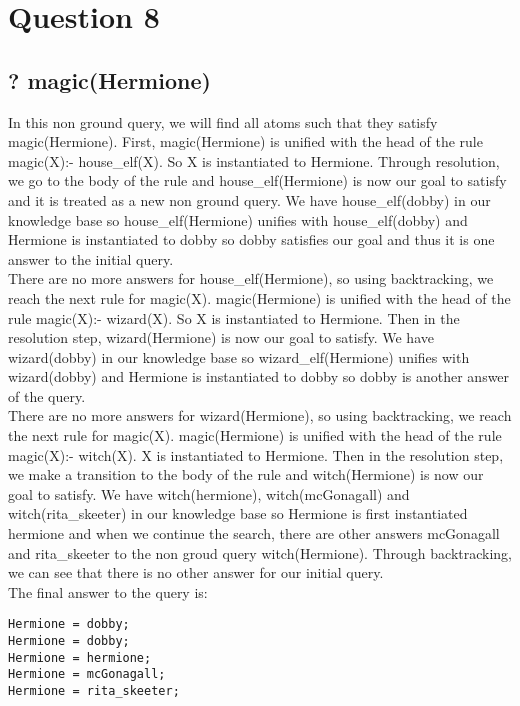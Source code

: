 \newpage
\section{Question 8}

\subsection{? magic(Hermione)}
In this non ground query, we will find all atoms such that they satisfy magic(Hermione). 
 First,
magic(Hermione) is unified with the head of the rule magic(X):- house\_elf(X). So X is instantiated to Hermione.
 Through resolution, we go to the body of the rule and house\_elf(Hermione) is now our goal to satisfy and it is treated as a new non ground query.
 We have house\_elf(dobby) in our knowledge base
so house\_elf(Hermione) unifies with house\_elf(dobby) and Hermione is instantiated to dobby so dobby satisfies our goal and thus it is one answer to the initial query. \\

There are no more answers for house\_elf(Hermione), so using backtracking, we reach the next rule for
magic(X). magic(Hermione) is unified with the head of the rule magic(X):- wizard(X). So X is instantiated
to Hermione. Then in the resolution step, wizard(Hermione) is now our goal to satisfy. We have
wizard(dobby) in our knowledge base so wizard\_elf(Hermione) unifies with wizard(dobby) and
Hermione is instantiated to dobby so dobby is another answer of the query.\\

There are no more answers for wizard(Hermione), so using backtracking, we reach the next rule for
magic(X). magic(Hermione) is unified with the head of the rule magic(X):- witch(X). X is instantiated to
Hermione. Then in the resolution step, we make a transition to the body of the rule and
witch(Hermione) is now our goal to satisfy. We have witch(hermione), witch(mcGonagall) and
witch(rita\_skeeter) in our knowledge base so Hermione is first instantiated hermione and when we
continue the search, there are other answers mcGonagall and rita\_skeeter to the non groud query
witch(Hermione). Through backtracking, we can see that there is no other answer for our initial query.
\\
The final answer to the query is:
\begin{lstlisting}
Hermione = dobby;
Hermione = dobby;
Hermione = hermione;
Hermione = mcGonagall;
Hermione = rita_skeeter;
\end{lstlisting}


